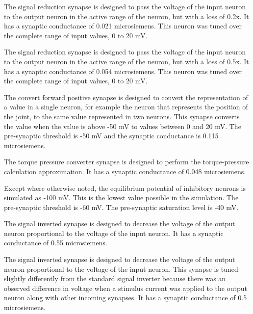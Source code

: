 
The signal reduction synapse is designed to pass the voltage of the input neuron
to the output neuron in the active range of the neuron, but with a loss of 0.2x. 
It has a synaptic  conductance of 0.021 microsiemens. This neuron was tuned
over the complete range of input values, 0 to 20 mV.


The signal reduction synapse is designed to pass the voltage of the input neuron
to the output neuron in the active range of the neuron, but with a loss of 0.5x. 
It has a synaptic  conductance of 0.054 microsiemens. This neuron was tuned
over the complete range of input values, 0 to 20 mV.


The convert forward positive synapse is designed to convert the representation
of a value in a single neuron, for example the neuron that represents the 
position of the joint, to the same value represented in two neurons. This
synapse converts the value when the value is above -50 mV to values between 0 
and 20 mV. The pre-synaptic
threshold is -50 mV and the synaptic conductance is 0.115 microsiemens.


The torque pressure converter synapse is designed to perform the torque-pressure
calculation approximation. It has a synaptic 
conductance of 0.048 microsiemens.


Except where otherwise noted, the equilibrium potential of inhibitory neurons
is simulated as -100 mV. This is the lowest value possible in the simulation.
The pre-synaptic threshold is -60 mV. The pre-synaptic saturation level is -40
mV.


The signal inverted synapse is designed to decrease the voltage of the output 
neuron proportional to the voltage of the input neuron. It has a synaptic 
conductance of 0.55 microsiemens.


The signal inverted synapse is designed to decrease the voltage of the output 
neuron proportional to the voltage of the input neuron. This synapse is tuned
slightly differently from the standard signal inverter because there was an
observed difference in voltage when a stimulus current was applied to the output
neuron along with other incoming synapses. It has a synaptic 
conductance of 0.5 microsiemens.

